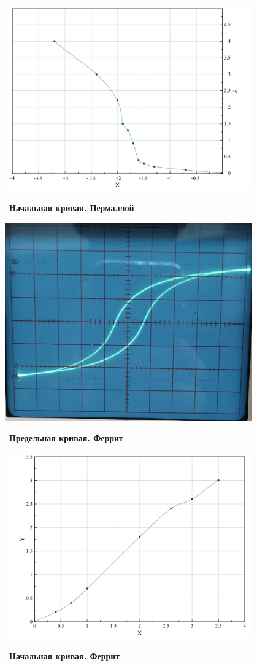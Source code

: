 \begin{center}
	\includegraphics[width = 0.8\textwidth]{pics/1_rev.jpg}
\end{center}\
\textbf{Начальная кривая. Пермаллой}

\newpage

\begin{center}
	\includegraphics[width = 0.8\textwidth]{pics/2.jpg}
\end{center}\
\textbf{Предельная кривая. Феррит}

\begin{center}
	\includegraphics[width = 0.8\textwidth]{pics/3_rev.jpg}
\end{center}\
\textbf{Начальная кривая. Феррит}

